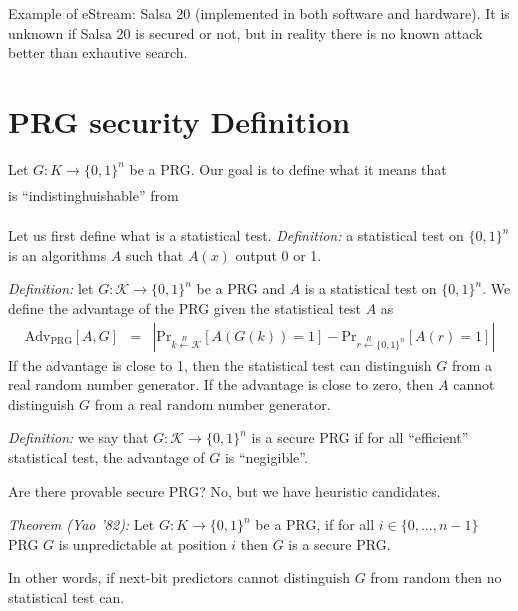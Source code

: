 \documentclass{article}
\begin{document}
Example of eStream: Salsa 20 (implemented in both software and hardware).
It is unknown if Salsa 20 is secured or not, but in reality there is no known
attack better than exhautive search.

\section{PRG security Definition}

Let $G: K \to \lbrace 0, 1\rbrace^n$ be a PRG. Our goal is to define what it
means that
\begin{eqnarray}
  [k \xleftarrow{R} \mathcal{K}, \text{ output } G(k) ]
\end{eqnarray}
is ``indistinghuishable'' from
\begin{eqnarray}
  [r \xleftarrow{R} \lbrace 0, 1 \rbrace^n, \text{ output } r]
\end{eqnarray}

Let us first define what is a statistical test.
\emph{Definition:} a statistical test on $\lbrace 0, 1 \rbrace^n$ is an
algorithms $A$ such that $A(x)$ output 0 or 1.

\emph{Definition:} let $G: \mathcal{K} \to \lbrace 0,1 \rbrace^n$ be a PRG and
$A$ is a statistical test on $\lbrace 0, 1\rbrace^n$. We define the advantage of
the PRG given the statistical test $A$ as
\begin{eqnarray}
  \text{Adv}_\text{PRG}[A, G] &=& \left| \text{Pr}_{k \xleftarrow{R}
      \mathcal{K}} [A(G(k)) = 1] - \text{Pr}_{r \xleftarrow{R} \lbrace 0,
      1 \rbrace^n }[A(r) = 1] \right|
\end{eqnarray}
If the advantage is close to 1, then the statistical test can distinguish $G$
from a real random number generator. If the advantage is close to zero, then $A$
cannot distinguish $G$ from a real random number generator.

\emph{Definition:} we say that $G: \mathcal{K} \to \lbrace 0, 1 \rbrace^n$ is a
secure PRG if for all ``efficient'' statistical test, the advantage of $G$ is
``negigible''.

Are there provable secure PRG? No, but we have heuristic candidates.

\emph{Theorem (Yao '82):} Let $G: K \to \lbrace 0, 1 \rbrace^n$ be a PRG, if for
all $i \in \lbrace 0, \dotsc, n-1 \rbrace$ PRG $G$ is unpredictable at position
$i$ then $G$ is a secure PRG.

In other words, if next-bit predictors cannot distinguish $G$ from random then
no statistical test can.
\end{document}
